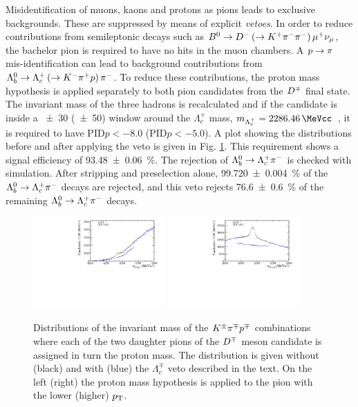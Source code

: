 Misidentification of muons, kaons and protons as pions leads to exclusive backgrounds. 
These are suppressed by means of explicit \emph{vetoes}. In order to 
reduce contributions from semileptonic decays such as
$B^0\rightarrow D^-\left(\rightarrow K^+\pi^-\pi^-\right)\mu^{+}\nu_{\mu}$, the bachelor pion is required
to have no hits in the muon chambers.
A $p\rightarrow\pi$ mis-identification can lead to background contributions from
$\Lambda^0_b\rightarrow\Lambda_c^{+}\left(\rightarrow K^-\pi^+ p\right)\pi^-$. To reduce these
contributions, the proton mass hypothesis is applied separately to both pion candidates
from the $D^\mp$ final state. The invariant mass of the three hadrons is
recalculated and if the candidate is inside a \SI{\pm30}{\MeVcc} (\SI{\pm50}{\MeVcc}) window around the
$\Lambda_c^{+}$ mass, $m_{\Lambda_c^{+}} = \SI{2286.46}{\MeVcc}$~\cite{PDG}, it is
required to have PID$p<-8.0$ (PID$p<-5.0$). 
A plot showing the distributions before
and after applying the veto is given in Fig. \ref{fig:lambdaveto}. This requirement
shows a signal efficiency of \SI{93.48\pm0.06}{\percent}. The rejection of
$\Lambda^0_b\rightarrow\Lambda_c^{+}\pi^-$ is checked with simulation. 
After stripping and preselection alone, \SI{99.720\pm0.004}{\percent} of the
$\Lambda^0_b\rightarrow\Lambda_c^{+}\pi^-$ decays are rejected, and this veto rejects
\SI{76.6\pm0.6}{\percent} of the remaining $\Lambda^0_b\rightarrow\Lambda_c^{+}\pi^-$ decays.

\begin{figure}[t]
	\begin{center}
		\includegraphics[width=0.45\textwidth]{02Selection/figs/LcHypo1.pdf}
		\includegraphics[width=0.45\textwidth]{02Selection/figs/LcHypo2.pdf}
	\end{center}
        \vspace{-2mm}
	\caption{Distributions of the invariant mass of the $K^\pm\pi^\mp p^\mp$ combinations
	where each of the two daughter pions of the $D^\mp$ meson candidate is assigned in turn the proton mass. The
	distribution is given without (black) and with (blue) the $\Lambda_c^{\mp}$
	veto described in the text. On the left (right) the proton mass hypothesis is
	applied to the pion with the lower (higher) $\mbox{$p_{\rm T}$}$.}
	\label{fig:lambdaveto}
\end{figure}

